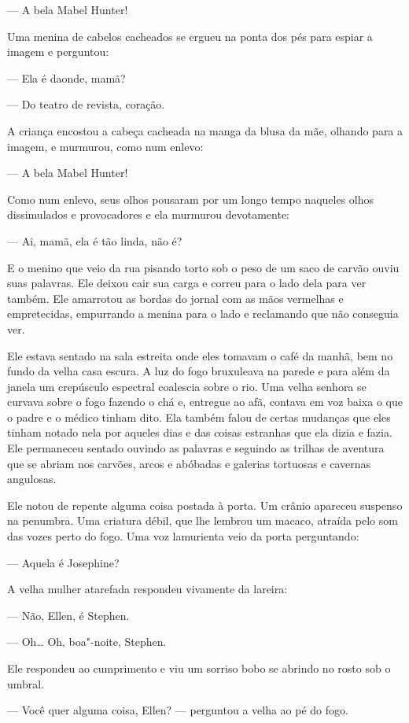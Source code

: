  --- A bela Mabel Hunter!

Uma menina de cabelos cacheados se ergueu na ponta dos pés para espiar a
imagem e perguntou:

 --- Ela é daonde, mamã?

 --- Do teatro de revista, coração.

A criança encostou a cabeça cacheada na manga da blusa da mãe, olhando
para a imagem, e murmurou, como num enlevo:

 --- A bela Mabel Hunter!

Como num enlevo, seus olhos pousaram por um longo tempo naqueles olhos
dissimulados e provocadores e ela murmurou devotamente:

 --- Ai, mamã, ela é tão linda, não é?

E o menino que veio da rua pisando torto sob o peso de um saco de carvão
ouviu suas palavras. Ele deixou cair sua carga e correu para o lado
dela para ver também. Ele amarrotou as bordas do jornal com as mãos
vermelhas e empretecidas, empurrando a menina para o lado e reclamando
que não conseguia ver.

Ele estava sentado na sala estreita onde eles tomavam o café da manhã,
bem no fundo da velha casa escura. A luz do fogo bruxuleava na
parede e para além da janela um crepúsculo espectral coalescia sobre o
rio. Uma velha senhora se curvava sobre o fogo fazendo o chá e,
entregue ao afã, contava em voz baixa o que o padre e o médico tinham
dito. Ela também falou de certas mudanças que eles tinham notado nela
por aqueles dias e das coisas estranhas que ela dizia e fazia. Ele
permaneceu sentado ouvindo as palavras e seguindo as trilhas de
aventura que se abriam nos carvões, arcos e abóbadas e galerias
tortuosas e cavernas angulosas.

Ele notou de repente alguma coisa postada à porta. Um crânio apareceu
suspenso na penumbra. Uma criatura débil, que lhe lembrou um
macaco, atraída pelo som das vozes perto do fogo. Uma voz lamurienta
veio da porta perguntando:

 --- Aquela é Josephine?

A velha mulher atarefada respondeu vivamente da lareira:

 --- Não, Ellen, é Stephen.

 --- Oh\ldots{} Oh, boa"-noite, Stephen.

Ele respondeu ao cumprimento e viu um sorriso bobo se abrindo no rosto
sob o umbral.

 --- Você quer alguma coisa, Ellen? --- perguntou a velha ao pé do fogo.

